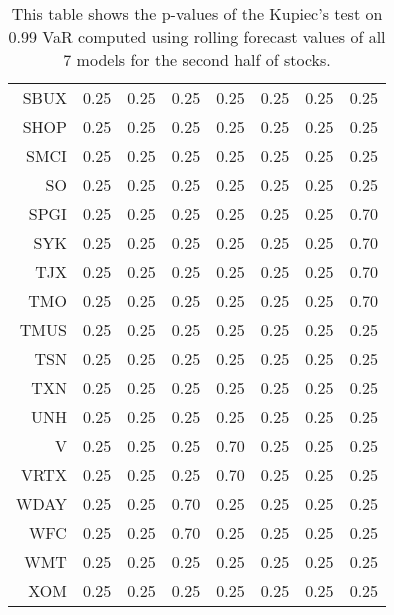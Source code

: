 \begin{table}[ht]
\begin{tabular}{rrrrrrrr}
  SBUX & 0.25 & 0.25 & 0.25 & 0.25 & 0.25 & 0.25 & 0.25 \\ 
  SHOP & 0.25 & 0.25 & 0.25 & 0.25 & 0.25 & 0.25 & 0.25 \\ 
  SMCI & 0.25 & 0.25 & 0.25 & 0.25 & 0.25 & 0.25 & 0.25 \\ 
  SO & 0.25 & 0.25 & 0.25 & 0.25 & 0.25 & 0.25 & 0.25 \\ 
  SPGI & 0.25 & 0.25 & 0.25 & 0.25 & 0.25 & 0.25 & 0.70 \\ 
  SYK & 0.25 & 0.25 & 0.25 & 0.25 & 0.25 & 0.25 & 0.70 \\ 
  TJX & 0.25 & 0.25 & 0.25 & 0.25 & 0.25 & 0.25 & 0.70 \\ 
  TMO & 0.25 & 0.25 & 0.25 & 0.25 & 0.25 & 0.25 & 0.70 \\ 
  TMUS & 0.25 & 0.25 & 0.25 & 0.25 & 0.25 & 0.25 & 0.25 \\ 
  TSN & 0.25 & 0.25 & 0.25 & 0.25 & 0.25 & 0.25 & 0.25 \\ 
  TXN & 0.25 & 0.25 & 0.25 & 0.25 & 0.25 & 0.25 & 0.25 \\ 
  UNH & 0.25 & 0.25 & 0.25 & 0.25 & 0.25 & 0.25 & 0.25 \\ 
  V & 0.25 & 0.25 & 0.25 & 0.70 & 0.25 & 0.25 & 0.25 \\ 
  VRTX & 0.25 & 0.25 & 0.25 & 0.70 & 0.25 & 0.25 & 0.25 \\ 
  WDAY & 0.25 & 0.25 & 0.70 & 0.25 & 0.25 & 0.25 & 0.25 \\ 
  WFC & 0.25 & 0.25 & 0.70 & 0.25 & 0.25 & 0.25 & 0.25 \\ 
  WMT & 0.25 & 0.25 & 0.25 & 0.25 & 0.25 & 0.25 & 0.25 \\ 
  XOM & 0.25 & 0.25 & 0.25 & 0.25 & 0.25 & 0.25 & 0.25 \\ 
   \hline
\end{tabular}
\caption[Kupiec's test p-values, alpha =0.99 (2)]{This table shows the p-values of the Kupiec's test on 0.99 VaR computed using rolling forecast values of all 7 models for the second half of stocks.} 
\label{Table:Kupiec_test_rolling_0.99_2}
\end{table}
